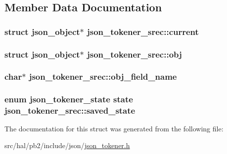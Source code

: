 \subsection{Member Data Documentation}
\subsubsection[{\texorpdfstring{current}{current}}]{\setlength{\rightskip}{0pt plus 5cm}struct {\bf json\+\_\+object}$\ast$ json\+\_\+tokener\+\_\+srec\+::current}\hypertarget{structjson__tokener__srec_a466f192f920368a5a6375aeba1e2757f}{}\label{structjson__tokener__srec_a466f192f920368a5a6375aeba1e2757f}
\subsubsection[{\texorpdfstring{obj}{obj}}]{\setlength{\rightskip}{0pt plus 5cm}struct {\bf json\+\_\+object}$\ast$ json\+\_\+tokener\+\_\+srec\+::obj}\hypertarget{structjson__tokener__srec_ad2bb71affec1da5ba1d9952c3bf2c12a}{}\label{structjson__tokener__srec_ad2bb71affec1da5ba1d9952c3bf2c12a}
\subsubsection[{\texorpdfstring{obj\+\_\+field\+\_\+name}{obj_field_name}}]{\setlength{\rightskip}{0pt plus 5cm}char$\ast$ json\+\_\+tokener\+\_\+srec\+::obj\+\_\+field\+\_\+name}\hypertarget{structjson__tokener__srec_a99551c172e97ac2e7a3849a50b4f51ca}{}\label{structjson__tokener__srec_a99551c172e97ac2e7a3849a50b4f51ca}
\subsubsection[{\texorpdfstring{saved\+\_\+state}{saved_state}}]{\setlength{\rightskip}{0pt plus 5cm}enum {\bf json\+\_\+tokener\+\_\+state} state json\+\_\+tokener\+\_\+srec\+::saved\+\_\+state}\hypertarget{structjson__tokener__srec_a868b9912dbb1e4813a630c944f522d48}{}\label{structjson__tokener__srec_a868b9912dbb1e4813a630c944f522d48}


The documentation for this struct was generated from the following file\+:\begin{DoxyCompactItemize}
\item 
src/hal/pb2/include/json/\hyperlink{json__tokener_8h}{json\+\_\+tokener.\+h}\end{DoxyCompactItemize}
